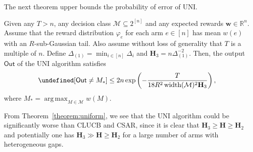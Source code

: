 \documentclass{article}
\newcommand{\Algorithm}{{\small \textsf{CLUCB}}\xspace}
\newcommand{\AlgorithmBud}{{\small \textsf{CSAR}}\xspace}
\newcommand{\Uniform}{{\small \textsf{UNI}}\xspace}
\newcommand{\Rew}{\varphi}
\newcommand{\M}{\mathcal M}
\newcommand{\RR}{\mathbb R}
\DeclareMathOperator{\rank}{width}
\DeclareMathOperator*{\argmax}{arg\,max}
\newcommand{\out}{\mathsf{Out}}
\let\Pr\undefined
\DeclareMathOperator{\Pr}{Pr}
\renewcommand{\vec}[1]{\boldsymbol{#1}}
\begin{document}
The next theorem upper bounds the probability of error of \Uniform.
\begin{theorem}
Given any $T>n$, any decision class $\M \subseteq 2^{[n]}$ and any expected rewards $\vec w \in \RR^{n}$.
Assume that the reward distribution $\Rew_e$ for each arm $e\in [n]$ has mean $w(e)$ with an $R$-sub-Gaussian tail.
Also assume without loss of generality that $T$ is a multiple of $n$.
Define $\Delta_{(1)}=\min_{i\in[n]}\Delta_i$ and $\mathbf H_3 = n\Delta_{(1)}^{-2}$.
Then, the output $\out$ of the \Uniform algorithm satisfies
\begin{equation}
\label{eq:uniform}
\Pr[\out\not=M_*] \le 2n\exp\left(- \frac{T}{18 R^2\rank(\M)^2 \mathbf H_{3}}\right),
\end{equation}
where $M_* = \argmax_{M\in \M} w(M)$.
\label{theorem:uniform}
\end{theorem}
 
From Theorem~\ref{theorem:uniform}, we see that the \Uniform algorithm could be significantly worse than \Algorithm and \AlgorithmBud,  since it is clear that $\mathbf H_3 \ge \mathbf H \ge \mathbf H_2$ and potentially one has $\mathbf H_3 \gg \mathbf H \ge \mathbf H_2$ for a large number of arms with heterogeneous gaps.
\end{document}
